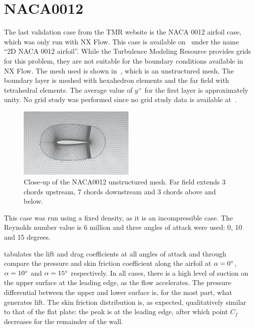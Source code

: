 \section{NACA0012}
The last validation case from the TMR website is the NACA 0012 airfoil case, which was only run with NX Flow. This case is available on~\cite{tmr} under the name ``2D NACA 0012 airfoil''. While the Turbulence Modeling Resource provides grids for this problem, they are not suitable for the boundary conditions available in NX Flow. The mesh used is shown in~, which is an unstructured mesh. The boundary layer is meshed with hexahedron elements and the far field with tetrahedral elements. The average value of $y^+$ for the first layer is approximately unity. No grid study was performed since no grid study data is available at~\cite{tmr}.
\begin{figure}
    \centering
    \includegraphics[width=0.5\textwidth]{figs/naca0012/naca0012.png}
    \caption{Close-up of the NACA0012 unstructured mesh. Far field extends 3 chords upstream, 7 chords downstream and 3 chords above and below.}
    \label{fig:naca0012}
\end{figure}
This case was run using a fixed density, as it is an incompressible case. The Reynolds number value is 6 million and three angles of attack were used: 0, 10 and 15 degrees.

 tabulates the lift and drag coefficients at all angles of attack and  through  compare the pressure and skin friction coefficient along the airfoil at $\alpha=0^\circ$, $\alpha=10^\circ$ and $\alpha=15^\circ$ respectively. In all cases, there is a high level of suction on the upper surface at the leading edge, as the flow accelerates. The pressure differential between the upper and lower surface is, for the most part, what generates lift. The skin friction distribution is, as expected, qualitatively similar to that of the flat plate: the peak is at the leading edge, after which point $C_f$ decreases for the remainder of the wall. 

